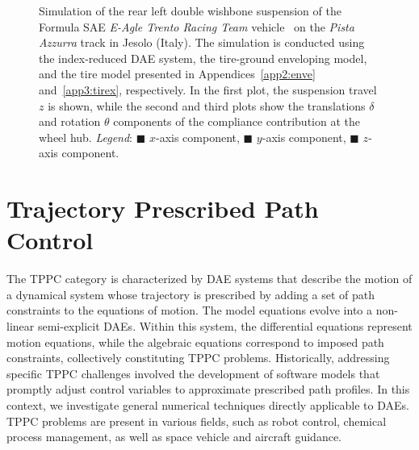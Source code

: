 \begin{figure}[htbp]
  \centering
  \small{}
  \caption{Simulation of the rear left double wishbone suspension of the Formula SAE \textit{E-Agle Trento Racing Team} vehicle~\cite{eagle} on the \textit{Pista Azzurra} track in Jesolo (Italy). The simulation is conducted using the index-reduced \ac{DAE} system, the tire-ground enveloping model, and the tire model presented in Appendices~\ref{app2:enve} and~\ref{app3:tirex}, respectively. In the first plot, the suspension travel $z$ is shown, while the second and third plots show the translations $\delta$ and rotation $\theta$ components of the compliance contribution at the wheel hub. \emph{Legend}: {\color{mycolor1}$\blacksquare$} $x$-axis component, {\color{mycolor2}$\blacksquare$} $y$-axis component, {\color{mycolor3}$\blacksquare$} $z$-axis component.}
  \label{chap4:fig:suspension_pista_azzurra}
\end{figure}

\section{Trajectory Prescribed Path Control}
\label{chap4:sec:tppc}

The \ac{TPPC} category is characterized by \ac{DAE} systems that describe the motion of a dynamical system whose trajectory is prescribed by adding a set of path constraints to the equations of motion. The model equations evolve into a non-linear semi-explicit \acp{DAE}. Within this system, the differential equations represent motion equations, while the algebraic equations correspond to imposed path constraints, collectively constituting \ac{TPPC} problems. Historically, addressing specific \ac{TPPC} challenges involved the development of software models that promptly adjust control variables to approximate prescribed path profiles. In this context, we investigate general numerical techniques directly applicable to \acp{DAE}. \ac{TPPC} problems are present in various fields, such as robot control, chemical process management, as well as space vehicle and aircraft guidance.

